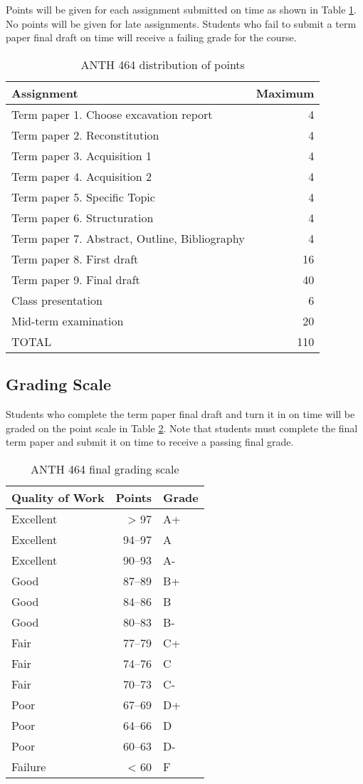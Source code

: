 \documentclass{scrartcl}
\begin{document}
Points will be given for each assignment submitted on time as shown in Table
\ref{tab:org55daefb}. No points will be given for late assignments. Students who fail to
submit a term paper final draft on time will receive a failing grade for the
course.

\begin{table}[htbp]
\caption{\label{tab:org55daefb}
ANTH 464 distribution of points}
\centering
\begin{tabular}{lr}
Assignment & Maximum\\
\hline
Term paper 1. Choose excavation report & 4\\
Term paper 2. Reconstitution & 4\\
Term paper 3. Acquisition 1 & 4\\
Term paper 4. Acquisition 2 & 4\\
Term paper 5. Specific Topic & 4\\
Term paper 6. Structuration & 4\\
Term paper 7. Abstract, Outline, Bibliography & 4\\
Term paper 8. First draft & 16\\
Term paper 9. Final draft & 40\\
\hline
Class presentation & 6\\
\hline
Mid-term examination & 20\\
\hline
TOTAL & 110\\
\end{tabular}
\end{table}


\subsection{Grading Scale}
\label{sec:orga7cc498}
Students who complete the term paper final draft and turn it in on time will be
graded on the point scale in Table \ref{tab:orgcb28d6b}. Note that students must
complete the final term paper and submit it on time to receive a passing final
grade.

\begin{table}[htbp]
\caption{\label{tab:orgcb28d6b}
ANTH 464 final grading scale}
\centering
\begin{tabular}{lrl}
Quality of Work & Points & Grade\\
\hline
Excellent & \textgreater{} 97 & A+\\
Excellent & 94--97 & A\\
Excellent & 90--93 & A-\\
Good & 87--89 & B+\\
Good & 84--86 & B\\
Good & 80--83 & B-\\
Fair & 77--79 & C+\\
Fair & 74--76 & C\\
Fair & 70--73 & C-\\
Poor & 67--69 & D+\\
Poor & 64--66 & D\\
Poor & 60--63 & D-\\
Failure & \textless{} 60 & F\\
\end{tabular}
\end{table}
\end{document}
